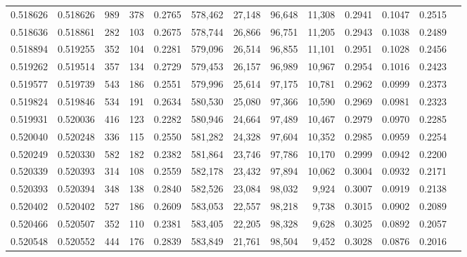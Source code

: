 \begin{tabular}{rrrrrrrrrrrrr}
0.518626 & 0.518626 &   989 &   378 &                                     0.2765 & 578,462 &  27,148 &  96,648 &  11,308 & 0.2941 & 0.1047 & 0.2515 \\
0.518636 & 0.518861 &   282 &   103 &                                     0.2675 & 578,744 &  26,866 &  96,751 &  11,205 & 0.2943 & 0.1038 & 0.2489 \\
0.518894 & 0.519255 &   352 &   104 &                                     0.2281 & 579,096 &  26,514 &  96,855 &  11,101 & 0.2951 & 0.1028 & 0.2456 \\
0.519262 & 0.519514 &   357 &   134 &                                     0.2729 & 579,453 &  26,157 &  96,989 &  10,967 & 0.2954 & 0.1016 & 0.2423 \\
0.519577 & 0.519739 &   543 &   186 &                                     0.2551 & 579,996 &  25,614 &  97,175 &  10,781 & 0.2962 & 0.0999 & 0.2373 \\
0.519824 & 0.519846 &   534 &   191 &                                     0.2634 & 580,530 &  25,080 &  97,366 &  10,590 & 0.2969 & 0.0981 & 0.2323 \\
0.519931 & 0.520036 &   416 &   123 &                                     0.2282 & 580,946 &  24,664 &  97,489 &  10,467 & 0.2979 & 0.0970 & 0.2285 \\
0.520040 & 0.520248 &   336 &   115 &                                     0.2550 & 581,282 &  24,328 &  97,604 &  10,352 & 0.2985 & 0.0959 & 0.2254 \\
0.520249 & 0.520330 &   582 &   182 &                                     0.2382 & 581,864 &  23,746 &  97,786 &  10,170 & 0.2999 & 0.0942 & 0.2200 \\
0.520339 & 0.520393 &   314 &   108 &                                     0.2559 & 582,178 &  23,432 &  97,894 &  10,062 & 0.3004 & 0.0932 & 0.2171 \\
0.520393 & 0.520394 &   348 &   138 &                                     0.2840 & 582,526 &  23,084 &  98,032 &   9,924 & 0.3007 & 0.0919 & 0.2138 \\
0.520402 & 0.520402 &   527 &   186 &                                     0.2609 & 583,053 &  22,557 &  98,218 &   9,738 & 0.3015 & 0.0902 & 0.2089 \\
0.520466 & 0.520507 &   352 &   110 &                                     0.2381 & 583,405 &  22,205 &  98,328 &   9,628 & 0.3025 & 0.0892 & 0.2057 \\
0.520548 & 0.520552 &   444 &   176 &                                     0.2839 & 583,849 &  21,761 &  98,504 &   9,452 & 0.3028 & 0.0876 & 0.2016 \\

\end{tabular}
